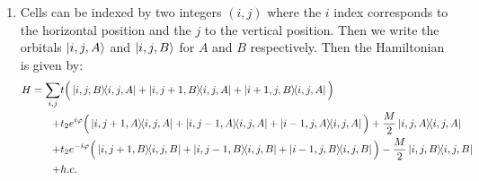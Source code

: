 \documentclass[10pt,a4paper]{article}
\begin{document}
\begin{enumerate}

\item Cells can be indexed by two integers $(i, j)$ where the $i$ index corresponds to the horizontal position and the $j$ to the vertical position. Then we write the orbitals $\ket{i, j, A}$ and $\ket{i, j, B}$ for $A$ and $B$ respectively. Then the Hamiltonian is given by:
\begin{align*}
H = \sum_{i, j} &t\Big(\op{i, j, B}{i, j, A} + \op{i, j+1, B}{i, j, A} + \op{i+1, j, B}{i, j, A}\Big)\\
+ &t_2 e^{i\varphi}\Big(\op{i, j + 1, A}{i,j, A} + \op{i, j - 1, A}{i,j, A} + \op{i - 1, j, A}{i,j, A}\Big) + \frac{M}{2}\op{i, j, A}\\
+ &t_2 e^{-i\varphi}\Big(\op{i, j + 1, B}{i,j, B} + \op{i, j - 1, B}{i,j, B} + \op{i - 1, j, B}{i,j, B}\Big) - \frac{M}{2}\op{i, j, B}\\
+ &h.c.
\end{align*}


\end{enumerate}
\end{document}
